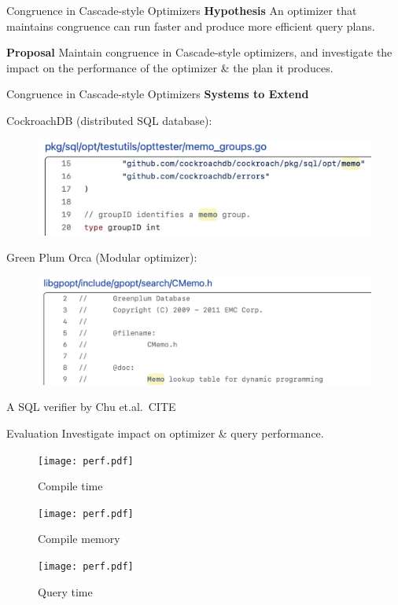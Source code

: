 \documentclass{beamer}
\begin{document}
  \begin{frame}{Congruence in Cascade-style Optimizers}
    \textbf{Hypothesis}
    An optimizer that maintains congruence can run faster and
    produce more efficient query plans.

    \textbf{Proposal}
    Maintain congruence in Cascade-style optimizers, and investigate
    the impact on the performance of the optimizer \& the 
    plan it produces.
  \end{frame}

  \begin{frame}{Congruence in Cascade-style Optimizers}
    \textbf{Systems to Extend}

    CockroachDB (distributed SQL database):
    \begin{figure}
      \includegraphics[width=0.6\linewidth]{cockroach.jpeg}
    \end{figure}
    Green Plum Orca (Modular optimizer):
    \begin{figure}
      \includegraphics[width=0.6\linewidth]{orca.jpeg}
    \end{figure}
    A SQL verifier by Chu et.al.~CITE
  \end{frame}

  \begin{frame}{Evaluation}
    Investigate impact on optimizer \& query performance.
    \begin{figure}
    \begin{minipage}{0.3\textwidth}
        \texttt{[image: perf.pdf]} %
        \caption*{Compile time}
    \end{minipage}
    \begin{minipage}{0.3\textwidth}
        \texttt{[image: perf.pdf]} %
        \caption*{Compile memory}
    \end{minipage}
    \begin{minipage}{0.3\textwidth}
      \texttt{[image: perf.pdf]} %
      \caption*{Query time}
    \end{minipage}
    \end{figure}
  \end{frame}
\end{document}
